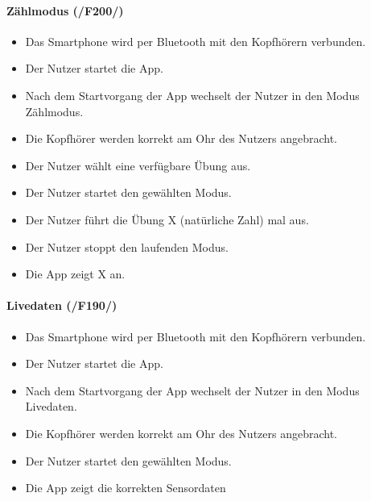 \documentclass[a4paper,12pt]{article}
\begin{document}
      \paragraph{Zählmodus (/F200/)}
      \begin{itemize}
        \item[] Das Smartphone wird per Bluetooth mit den Kopfhörern verbunden.
        \item[] Der Nutzer startet die App.
        \item[] Nach dem Startvorgang der App wechselt der Nutzer in den Modus \glqq Zählmodus\grqq .
        \item[] Die Kopfhörer werden korrekt am Ohr des Nutzers angebracht.
        \item[] Der Nutzer wählt eine verfügbare Übung aus. 
        \item[] Der Nutzer startet den gewählten Modus.
        \item[] Der Nutzer führt die Übung X (natürliche Zahl) mal aus.
        \item[] Der Nutzer stoppt den laufenden Modus.
        \item[] Die App zeigt X an.
      \end{itemize}

      \paragraph{Livedaten (/F190/)}
      \begin{itemize}
        \item[] Das Smartphone wird per Bluetooth mit den Kopfhörern verbunden.
        \item[] Der Nutzer startet die App.
        \item[] Nach dem Startvorgang der App wechselt der Nutzer in den Modus \glqq Livedaten\grqq .
        \item[] Die Kopfhörer werden korrekt am Ohr des Nutzers angebracht.
        \item[] Der Nutzer startet den gewählten Modus.
        \item[] Die App zeigt die korrekten Sensordaten 
      \end{itemize}
\end{document}
